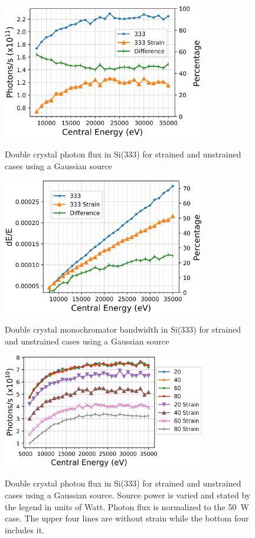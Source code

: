 \documentclass{iucr}
\begin{document}
\begin{figure}
\caption{Double crystal photon flux in Si(333) for strained and unstrained cases using a Gaussian source}
\includegraphics[width = 8.85cm]{images/333flux.png}
\label{fig:333flux}
\end{figure}

\begin{figure}
\caption{Double crystal monochromator bandwidth in Si(333) for strained and unstrained cases using a Gaussian source}
\includegraphics[width = 8.85cm]{images/333monobw.png}
\label{fig:333monobw}
\end{figure}

\begin{figure}
\caption{Double crystal photon flux in Si(333) for strained and unstrained cases using a Gaussian source. Source power is varied and stated by the legend in units of Watt. Photon flux is normalized to the 50~W case. The upper four lines are without strain while the bottom four includes it.}
\includegraphics[width = 8.85cm]{images/333strainpower.png}
\label{fig:333strainpower}
\end{figure}
\end{document}
